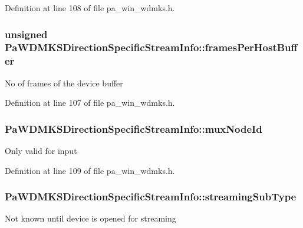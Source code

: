 Definition at line 108 of file pa\+\_\+win\+\_\+wdmks.\+h.

\subsubsection[{\texorpdfstring{frames\+Per\+Host\+Buffer}{framesPerHostBuffer}}]{\setlength{\rightskip}{0pt plus 5cm}unsigned Pa\+W\+D\+M\+K\+S\+Direction\+Specific\+Stream\+Info\+::frames\+Per\+Host\+Buffer}\hypertarget{struct_pa_w_d_m_k_s_direction_specific_stream_info_a5b5248935d8b586285805bb827e1592f}{}\label{struct_pa_w_d_m_k_s_direction_specific_stream_info_a5b5248935d8b586285805bb827e1592f}
No of frames of the device buffer 

Definition at line 107 of file pa\+\_\+win\+\_\+wdmks.\+h.

\subsubsection[{\texorpdfstring{mux\+Node\+Id}{muxNodeId}}]{ Pa\+W\+D\+M\+K\+S\+Direction\+Specific\+Stream\+Info\+::mux\+Node\+Id}\hypertarget{struct_pa_w_d_m_k_s_direction_specific_stream_info_ae4a79825046710f1fee6309b451983de}{}\label{struct_pa_w_d_m_k_s_direction_specific_stream_info_ae4a79825046710f1fee6309b451983de}
Only valid for input 

Definition at line 109 of file pa\+\_\+win\+\_\+wdmks.\+h.

\subsubsection[{\texorpdfstring{streaming\+Sub\+Type}{streamingSubType}}]{ Pa\+W\+D\+M\+K\+S\+Direction\+Specific\+Stream\+Info\+::streaming\+Sub\+Type}\hypertarget{struct_pa_w_d_m_k_s_direction_specific_stream_info_a38c7069753a67167c66a926f7859d1f3}{}\label{struct_pa_w_d_m_k_s_direction_specific_stream_info_a38c7069753a67167c66a926f7859d1f3}
Not known until device is opened for streaming 


